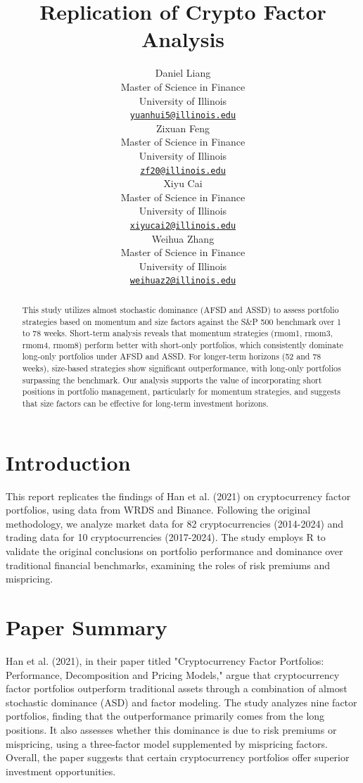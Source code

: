 \documentclass{article}
\title{Replication of Crypto Factor Analysis}
\author{
    \small
    \begin{minipage}[t]{0.24\textwidth}
        \centering
        Daniel Liang \\
        Master of Science in Finance \\
        University of Illinois \\
        \texttt{\href{mailto:yuanhui5@illinois.edu}{\nolinkurl{yuanhui5@illinois.edu}}}
    \end{minipage}
    \hfill
    \begin{minipage}[t]{0.24\textwidth}
        \centering
        Zixuan Feng \\
        Master of Science in Finance \\
        University of Illinois \\
        \texttt{\href{mailto:zf20@illinois.edu}{\nolinkurl{zf20@illinois.edu}}}
    \end{minipage}
    \hfill
    \begin{minipage}[t]{0.24\textwidth}
        \centering
        Xiyu Cai \\
        Master of Science in Finance \\
        University of Illinois \\
        \texttt{\href{mailto:xiyucai2@illinois.edu}{\nolinkurl{xiyucai2@illinois.edu}}}
    \end{minipage}
    \hfill
    \begin{minipage}[t]{0.24\textwidth}
        \centering
        Weihua Zhang \\
        Master of Science in Finance \\
        University of Illinois \\
        \texttt{\href{mailto:weihuaz2@illinois.edu}{\nolinkurl{weihuaz2@illinois.edu}}}
    \end{minipage}
}
\begin{document}
\maketitle


\begin{abstract}
This study utilizes almost stochastic dominance (AFSD and ASSD) to assess portfolio strategies based on momentum and size factors against the S\&P 500 benchmark over 1 to 78 weeks. Short-term analysis reveals that momentum strategies (rmom1, rmom3, rmom4, rmom8) perform better with short-only portfolios, which consistently dominate long-only portfolios under AFSD and ASSD. For longer-term horizons (52 and 78 weeks), size-based strategies show significant outperformance, with long-only portfolios surpassing the benchmark. Our analysis supports the value of incorporating short positions in portfolio management, particularly for momentum strategies, and suggests that size factors can be effective for long-term investment horizons.
\end{abstract}


\hypertarget{introduction}{%
\section{Introduction}\label{introduction}}

This report replicates the findings of Han et al. (2021) on cryptocurrency factor portfolios, using data from WRDS and Binance. Following the original methodology, we analyze market data for 82 cryptocurrencies (2014-2024) and trading data for 10 cryptocurrencies (2017-2024). The study employs R to validate the original conclusions on portfolio performance and dominance over traditional financial benchmarks, examining the roles of risk premiums and mispricing.

\hypertarget{paper-summary}{%
\section{Paper Summary}\label{paper-summary}}

Han et al. (2021), in their paper titled "Cryptocurrency Factor Portfolios: Performance, Decomposition and Pricing Models," argue that cryptocurrency factor portfolios outperform traditional assets through a combination of almost stochastic dominance (ASD) and factor modeling. The study analyzes nine factor portfolios, finding that the outperformance primarily comes from the long positions. It also assesses whether this dominance is due to risk premiums or mispricing, using a three-factor model supplemented by mispricing factors. Overall, the paper suggests that certain cryptocurrency portfolios offer superior investment opportunities.
\end{document}
